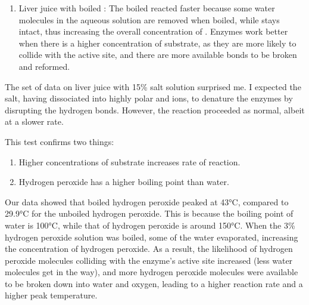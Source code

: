 \documentclass[12pt]{article}
\begin{document}
\begin{enumAlph}
\begin{enumerate}[label=\arabic*.]
        \item Liver juice with boiled : The boiled  reacted faster because 
        some water molecules in the aqueous solution are removed when boiled, while 
         stays intact, thus
        increasing the overall concentration of . Enzymes work better when 
        there is a higher concentration of substrate, as they are more likely to collide
        with the active site, and there are more available bonds to be broken 
        and reformed.

        
    \end{enumerate}

    \item The set of data on liver juice with 15\% salt solution surprised me. 
    I expected the salt, having dissociated into highly polar
     and  ions, to denature the enzymes by disrupting the hydrogen 
    bonds. However, the reaction proceeded as normal, albeit at a slower rate.

    \item This test confirms two things:
    \begin{enumerate}[label=\arabic*.]
        \item Higher concentrations of substrate increases rate of reaction.
        \item Hydrogen peroxide has a higher boiling point than water.
    \end{enumerate}

    \item Our data showed that boiled hydrogen peroxide peaked at 43°C, 
    compared to 29.9°C for the unboiled hydrogen peroxide. This is 
    because the boiling point of water is 100°C, while that of hydrogen peroxide 
    is around 150°C. When the 3\% hydrogen peroxide solution was boiled, 
    some of the water evaporated, increasing the concentration of hydrogen peroxide. 
    As a result, the likelihood of hydrogen peroxide molecules colliding with 
    the enzyme’s active site increased (less water molecules get in the way), and more
    hydrogen peroxide molecules were available to be broken down into water and oxygen, leading
     to a higher reaction rate and a higher peak temperature.

    
\end{enumAlph}
\end{document}
